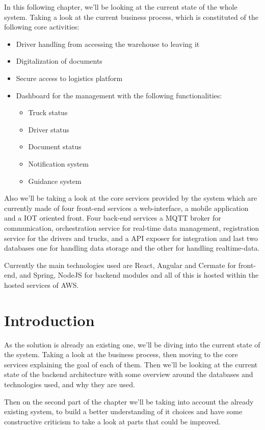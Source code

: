 In this following chapter, we'll be looking at the current state of the whole system.
Taking a look at the current business process, which is constituted of the following
core activities:
\begin{itemize}
    \item Driver handling from accessing the warehouse to leaving it
    \item Digitalization of documents
    \item Secure access to logistics platform
    \item Dashboard for the management with the following functionalities:
        \begin{itemize}
            \item Truck status
            \item Driver status
            \item Document status
            \item Notification system
            \item Guidance system
        \end{itemize}
\end{itemize}

Also we'll be taking a look at the core services provided by the system which are
currently made of four front-end services a web-interface, a mobile application and
a IOT oriented front. Four back-end services a MQTT broker for communication, orchestration
service for real-time data management, registration service for the drivers and trucks,
and a API exposer for integration and last two databases one for handling data storage and the other for handling realtime-data.

Currently the main technologies used are React, Angular and Cermate for front-end,
and Spring, NodeJS for backend modules and all of this is hosted within the hosted
services of AWS.
\newpage

\section{Introduction}

As the solution is already an existing one, we'll be diving into the current state of
the system. Taking a look at the business process, then moving to the core services
explaining the goal of each of them. Then we'll be looking at the current state of the
backend architecture with some overview around the databases and technologies used, and 
why they are used.

Then on the second part of the chapter we'll be taking into account the already existing
system, to build a better understanding of it choices and have some constructive criticism
to take a look at parts that could be improved.

